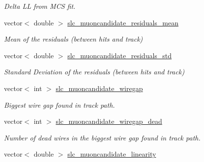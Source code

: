 \begin{DoxyCompactItemize}
\begin{DoxyCompactList}\small\item\em Delta L\-L from M\-C\-S fit. \end{DoxyCompactList}\item 
\hypertarget{classUBXSecEvent_a11364cce51cab53e8b49e2238d8b3ad9}{vector$<$ double $>$ \hyperlink{classUBXSecEvent_a11364cce51cab53e8b49e2238d8b3ad9}{slc\-\_\-muoncandidate\-\_\-residuals\-\_\-mean}}\label{classUBXSecEvent_a11364cce51cab53e8b49e2238d8b3ad9}

\begin{DoxyCompactList}\small\item\em Mean of the residuals (between hits and track) \end{DoxyCompactList}\item 
\hypertarget{classUBXSecEvent_aa2788c59b677811df5ed22223a7b0fe8}{vector$<$ double $>$ \hyperlink{classUBXSecEvent_aa2788c59b677811df5ed22223a7b0fe8}{slc\-\_\-muoncandidate\-\_\-residuals\-\_\-std}}\label{classUBXSecEvent_aa2788c59b677811df5ed22223a7b0fe8}

\begin{DoxyCompactList}\small\item\em Standard Deviation of the residuals (between hits and track) \end{DoxyCompactList}\item 
\hypertarget{classUBXSecEvent_a2d4129ec5151ca996a427ddb7026978c}{vector$<$ int $>$ \hyperlink{classUBXSecEvent_a2d4129ec5151ca996a427ddb7026978c}{slc\-\_\-muoncandidate\-\_\-wiregap}}\label{classUBXSecEvent_a2d4129ec5151ca996a427ddb7026978c}

\begin{DoxyCompactList}\small\item\em Biggest wire gap found in track path. \end{DoxyCompactList}\item 
\hypertarget{classUBXSecEvent_af5c4c1f7a954e46c752c3f323adade2b}{vector$<$ int $>$ \hyperlink{classUBXSecEvent_af5c4c1f7a954e46c752c3f323adade2b}{slc\-\_\-muoncandidate\-\_\-wiregap\-\_\-dead}}\label{classUBXSecEvent_af5c4c1f7a954e46c752c3f323adade2b}

\begin{DoxyCompactList}\small\item\em Number of dead wires in the biggest wire gap found in track path. \end{DoxyCompactList}\item 
\hypertarget{classUBXSecEvent_aa385ab36f52d07e5cdd303e82ae8035f}{vector$<$ double $>$ \hyperlink{classUBXSecEvent_aa385ab36f52d07e5cdd303e82ae8035f}{slc\-\_\-muoncandidate\-\_\-linearity}}\label{classUBXSecEvent_aa385ab36f52d07e5cdd303e82ae8035f}


\end{DoxyCompactItemize}
